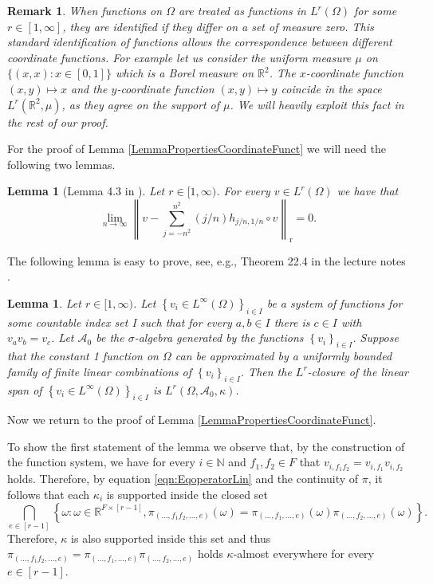 \documentclass[11pt]{article}
\newtheorem{lemma}[theorem]{Lemma}
\newtheorem{remark}[theorem]{Remark}
\begin{document}
\begin{remark} When functions on $\Omega$ are treated as functions in $L^r(\Omega)$ for some $r\in [1,\infty]$, they are identified if they differ on a set of measure zero. This standard identification of functions allows the correspondence between different coordinate functions. For example let us consider the uniform measure $\mu$ on $\{(x,x):x\in [0,1]\}$ which is a Borel measure on $\mathbb{R}^2$. The $x$-coordinate function $(x,y)\mapsto x$ and the $y$-coordinate function $(x,y)\mapsto y$ coincide in the space $L^r(\mathbb{R}^2,\mu)$, as they agree on the support of $\mu$. We will heavily exploit this fact in the rest of our proof.
\end{remark}

For the proof of Lemma \ref{LemmaPropertiesCoordinateFunct} we will need the following two lemmas.
\begin{lemma}[Lemma 4.3 in \cite{backhausz2018action}]
 Let $r \in[1, \infty)$. For every $v \in L^{r}(\Omega)$ we have that
$$
\lim _{n \rightarrow \infty}\left\|v-\sum_{j=-n^{2}}^{n^{2}}(j / n) h_{j / n, 1 / n} \circ v\right\|_{\mathrm{r}}=0 .
$$\end{lemma}

The following lemma is easy to prove, see, e.g., Theorem 22.4 in the lecture notes \cite{driver2004analysis}.

\begin{lemma}
Let $r \in[1, \infty)$. Let $\left\{v_{i} \in L^{\infty}(\Omega)\right\}_{i \in I}$ be a system of functions for some countable index set I such that for every $a, b \in I$ there is $c \in I$ with $v_{a} v_{b}=v_{c}$. Let $\mathcal{A}_{0}$ be the $\sigma$-algebra generated by the functions $\left\{v_{i}\right\}_{i \in I}$. Suppose that the constant 1 function on $\Omega$ can be approximated by a uniformly bounded family of finite linear combinations of $\left\{v_{i}\right\}_{i \in I}$. Then the $L^{r}$-closure of the linear span of $\left\{v_{i} \in L^{\infty}(\Omega)\right\}_{i \in I}$ is $L^{r}\left(\Omega, \mathcal{A}_{0}, \kappa\right)$.
\end{lemma} 

Now we return to the proof of Lemma \ref{LemmaPropertiesCoordinateFunct}.

\proof To show the first statement of the lemma we observe that, by the construction of the function system, we have for every $i \in \mathbb{N}$ and $f_{1}, f_{2} \in F$ that $v_{i, f_{1} f_{2}}=v_{i, f_{1}} v_{i, f_{2}}$ holds. Therefore, by equation \eqref{eqn:EqoperatorLin} and the continuity of $\pi$, it follows that each $\kappa_{i}$ is supported inside the closed set
$$
\bigcap_{e\in [r-1] }\left\{\omega: \omega \in \mathbb{R}^{F \times[r-1]}, \pi_{\left(\ldots,f_{1} f_{2},\ldots, e\right)}(\omega)=\pi_{\left(\ldots,f_{1},\ldots, e\right)}(\omega) \pi_{\left(\ldots,f_{2},\ldots, e\right)}(\omega)\right\} .
$$
Therefore, $\kappa$ is also supported inside this set and thus $\pi_{\left(\ldots,f_{1} f_{2},\ldots, e\right)}=\pi_{\left(\ldots,f_{1},\ldots, e\right)} \pi_{\left(\ldots,f_{2},\ldots, e\right)}$ holds $\kappa$-almost everywhere for every $e\in [r-1]$.
\end{document}

